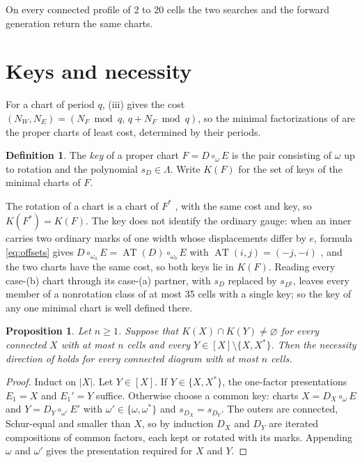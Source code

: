 \documentclass[11pt,a4paper]{amsart}
\numberwithin{equation}{section}
\theoremstyle{plain}
\newtheorem{proposition}[theorem]{Proposition}
\theoremstyle{definition}
\newtheorem{definition}[theorem]{Definition}
\newcommand{\Lam}{\Lambda}
\begin{document}
On every connected profile of \(2\) to \(20\) cells the two searches and the forward generation return the same charts.

\section{Keys and necessity}\label{sec:keys}

For a chart of period \(q\), (iii) gives the cost \((N_W,N_E)=(N_F\bmod q,\,q+N_F\bmod q)\), so the minimal factorizations of \cite[Def.~5.5]{McNamara2009Classification} are the proper charts of least cost, determined by their periods.

\begin{definition}\label{def:key}
The \emph{key} of a proper chart \(F=D\circ_\omega E\) is the pair consisting of \(\omega\) up to rotation and the polynomial \(s_D\in\Lam\).  Write \(K(F)\) for the set of keys of the minimal charts of \(F\).
\end{definition}

The rotation of a chart is a chart of \(F^*\) \cite[Lem.~3.19(ii)]{McNamara2009Classification}, with the same cost and key, so \(K(F^*)=K(F)\).  The key does not identify the ordinary gauge: when an inner carries two ordinary marks of one width whose displacements differ by \(e\), formula \eqref{eq:offsets} gives \(D\circ_{\omega_a}E=\operatorname{AT}(D)\circ_{\omega_b}E\) with \(\operatorname{AT}(i,j)=(-j,-i)\) \cite{Shields2026Gluing}, and the two charts have the same cost, so both keys lie in \(K(F)\).  Reading every case-(b) chart through its case-(a) partner, with \(s_D\) replaced by \(s_{D^{\mathsf t}}\), leaves every member of a nonrotation class of at most 35 cells with a single key; so the key of any one minimal chart is well defined there.

\begin{proposition}\label{prop:induction}
Let \(n\ge1\).  Suppose that \(K(X)\cap K(Y)\ne\varnothing\) for every connected \(X\) with at most \(n\) cells and every \(Y\in[X]\setminus\{X,X^*\}\).  Then the necessity direction of  holds for every connected diagram with at most \(n\) cells.
\end{proposition}

\begin{proof}
Induct on \(|X|\).  Let \(Y\in[X]\).  If \(Y\in\{X,X^*\}\), the one-factor presentations \(E_1=X\) and \(E_1'=Y\) suffice.  Otherwise choose a common key: charts \(X=D_X\circ_\omega E\) and \(Y=D_Y\circ_{\omega'}E'\) with \(\omega'\in\{\omega,\omega^*\}\) and \(s_{D_X}=s_{D_Y}\).  The outers are connected, Schur-equal and smaller than \(X\), so by induction \(D_X\) and \(D_Y\) are iterated compositions of common factors, each kept or rotated with its marks.  Appending \(\omega\) and \(\omega'\) gives the presentation required for \(X\) and \(Y\).
\end{proof}
\end{document}
